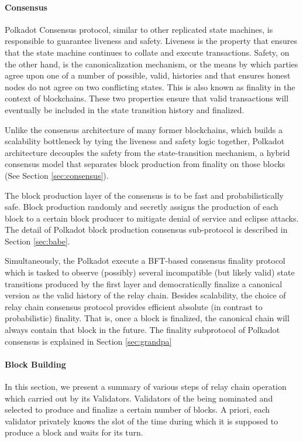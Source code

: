 \paragraph{Consensus}

Polkadot Consensus protocol, similar to other replicated state machines, is responsible to guarantee liveness and safety. Liveness is the property that ensures that the state machine continues to collate and execute transactions. Safety, on the other hand, is the canonicalization mechanism, or the means by which parties agree upon one of a number of possible, valid, histories and that ensures honest nodes do not agree on two conflicting states. This is also known as finality in the context of blockchains. These two properties ensure that valid transactions will eventually be included in the state transition
history and finalized.

Unlike the consensus architecture of many former blockchains, which builds a scalability bottleneck by tying the liveness and safety logic together, Polkadot architecture decouples the safety from the state-transition mechanism, a hybrid consensus model that separates block production from finality on those blocks (See Section \ref{sec:consensus}).

The block production layer of the consensus is to be fast and probabilistically safe. Block production randomly and secretly assigns the production of each block to a certain block producer to mitigate denial of service and eclipse attacks. The detail of Polkadot block production consensus sub-protocol is described in Section \ref{sec:babe}.

Simultaneously, the Polkadot execute a BFT-based consensus finality protocol which is tasked to observe (possibly) several incompatible (but likely valid) state transitions produced by the first layer and democratically finalize a canonical version as the valid history of the relay chain. Besides scalability, the choice of relay chain consensus protocol provides efficient absolute (in contrast to probabilistic) finality. That is, once a block is finalized, the canonical chain will always contain that block in the future. The finality subprotocol of Polkadot consensus is explained in Section
\ref{sec:grandpa}

\paragraph{Block Building}\label{sec:relaychainblockproduction}
In this section, we present a summary of various steps of relay chain operation which carried out by its Validators. Validators of the being nominated and selected to produce and finalize a certain number of blocks. A priori, each validator privately knows the slot of the time during which it is supposed to produce a block and waits for its turn.

